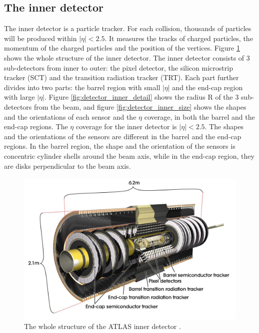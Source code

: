 \subsection{The inner detector}
The inner detector is a particle tracker.
For each collision, thousands of particles will be produced within $|\eta| < 2.5$.
It measures the tracks of charged particles, the momentum of the charged particles and the position of the vertices.
Figure \ref{fig:detector_inner_whole} shows the whole structure of the inner detector.
The inner detector consists of 3 sub-detectors from inner to outer: the pixel detector, the silicon microstrip tracker (SCT) and the transition radiation tracker (TRT).
Each part further divides into two parts: the barrel region with small $|\eta|$ and the end-cap region with large $|\eta|$.
Figure \ref{fig:detector_inner_detail} shows the radius R of the 3 sub-detectors from the beam, and figure \ref{fig:detector_inner_size} shows the shapes and the orientations of each sensor and the $\eta$ coverage, in both the barrel and the end-cap regions.
The $\eta$ coverage for the inner detector is $|\eta| < 2.5$.
The shapes and the orientations of the sensors are different in the barrel and the end-cap regions.
In the barrel region, the shape and the orientation of the sensors is concentric cylinder shells around the beam axis, while in the end-cap region, they are disks perpendicular to the beam axis.
\begin{figure}
\centering
\includegraphics[width=\textwidth]{data/photo/detector/inner_whole.jpg}
\caption{The whole structure of the ATLAS inner detector \cite{inner_photo}.}
\label{fig:detector_inner_whole}
\end{figure}
